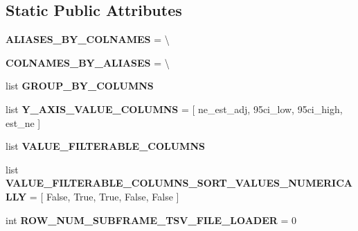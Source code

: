 \subsection*{Static Public Attributes}
\begin{DoxyCompactItemize}
\item 
{\bfseries A\+L\+I\+A\+S\+E\+S\+\_\+\+B\+Y\+\_\+\+C\+O\+L\+N\+A\+M\+ES} = \textbackslash{}\hypertarget{classnegui_1_1pgneestimationboxplotinterface_1_1PGNeEstimationBoxplotInterface_a0e19f81af3e0b91ae21a2ce5a76bd36c}{}\label{classnegui_1_1pgneestimationboxplotinterface_1_1PGNeEstimationBoxplotInterface_a0e19f81af3e0b91ae21a2ce5a76bd36c}

\item 
{\bfseries C\+O\+L\+N\+A\+M\+E\+S\+\_\+\+B\+Y\+\_\+\+A\+L\+I\+A\+S\+ES} = \textbackslash{}\hypertarget{classnegui_1_1pgneestimationboxplotinterface_1_1PGNeEstimationBoxplotInterface_adab7e21e2edd2180ca6173deb4129b5e}{}\label{classnegui_1_1pgneestimationboxplotinterface_1_1PGNeEstimationBoxplotInterface_adab7e21e2edd2180ca6173deb4129b5e}

\item 
list {\bfseries G\+R\+O\+U\+P\+\_\+\+B\+Y\+\_\+\+C\+O\+L\+U\+M\+NS}
\item 
list {\bfseries Y\+\_\+\+A\+X\+I\+S\+\_\+\+V\+A\+L\+U\+E\+\_\+\+C\+O\+L\+U\+M\+NS} = \mbox{[} \textquotesingle{}ne\+\_\+est\+\_\+adj\textquotesingle{}, \textquotesingle{}95ci\+\_\+low\textquotesingle{}, \textquotesingle{}95ci\+\_\+high\textquotesingle{}, \textquotesingle{}est\+\_\+ne\textquotesingle{} \mbox{]}\hypertarget{classnegui_1_1pgneestimationboxplotinterface_1_1PGNeEstimationBoxplotInterface_a1bf03d2b5b083be713149d53307902f5}{}\label{classnegui_1_1pgneestimationboxplotinterface_1_1PGNeEstimationBoxplotInterface_a1bf03d2b5b083be713149d53307902f5}

\item 
list {\bfseries V\+A\+L\+U\+E\+\_\+\+F\+I\+L\+T\+E\+R\+A\+B\+L\+E\+\_\+\+C\+O\+L\+U\+M\+NS}
\item 
list {\bfseries V\+A\+L\+U\+E\+\_\+\+F\+I\+L\+T\+E\+R\+A\+B\+L\+E\+\_\+\+C\+O\+L\+U\+M\+N\+S\+\_\+\+S\+O\+R\+T\+\_\+\+V\+A\+L\+U\+E\+S\+\_\+\+N\+U\+M\+E\+R\+I\+C\+A\+L\+LY} = \mbox{[} False, True, True, False, False \mbox{]}\hypertarget{classnegui_1_1pgneestimationboxplotinterface_1_1PGNeEstimationBoxplotInterface_a1fe3ca4886b349cb5d4294bb32e0c1e2}{}\label{classnegui_1_1pgneestimationboxplotinterface_1_1PGNeEstimationBoxplotInterface_a1fe3ca4886b349cb5d4294bb32e0c1e2}

\item 
int {\bfseries R\+O\+W\+\_\+\+N\+U\+M\+\_\+\+S\+U\+B\+F\+R\+A\+M\+E\+\_\+\+T\+S\+V\+\_\+\+F\+I\+L\+E\+\_\+\+L\+O\+A\+D\+ER} = 0\hypertarget{classnegui_1_1pgneestimationboxplotinterface_1_1PGNeEstimationBoxplotInterface_a28675aa612ec2586d60e31b22a7f0427}{}\label{classnegui_1_1pgneestimationboxplotinterface_1_1PGNeEstimationBoxplotInterface_a28675aa612ec2586d60e31b22a7f0427}


\end{DoxyCompactItemize}
